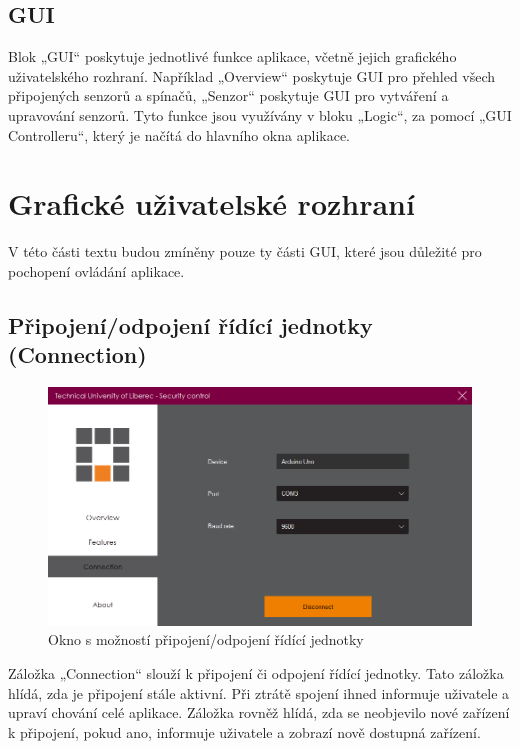 \documentclass[FM,DP]{tulthesis}  %
\begin{document}
\subsection{GUI}
Blok „GUI“ poskytuje jednotlivé funkce aplikace, včetně jejich grafického uživatelského rozhraní. Například „Overview“ poskytuje GUI pro přehled všech připojených senzorů a spínačů, „Senzor“ poskytuje GUI pro vytváření a upravování senzorů. Tyto funkce jsou využívány v bloku „Logic“, za pomocí „GUI Controlleru“, který je načítá do hlavního okna aplikace.

\section{Grafické uživatelské rozhraní}
V této části textu budou zmíněny pouze ty části GUI, které jsou důležité pro pochopení ovládání aplikace.

\subsection{Připojení/odpojení řídící jednotky (Connection)}

\begin{figure}[H]
\begin{center}
\includegraphics[width=\textwidth]{images/connection.png}
\caption{Okno s možností připojení/odpojení řídící jednotky}
\label{image}
\end{center}
\end{figure}

Záložka „Connection“ slouží k připojení či odpojení řídící jednotky. Tato záložka hlídá, zda je připojení stále aktivní. Při ztrátě spojení ihned informuje uživatele a upraví chování celé aplikace. Záložka rovněž hlídá, zda se neobjevilo nové zařízení k připojení, pokud ano, informuje uživatele a zobrazí nově dostupná zařízení. 
\end{document}
